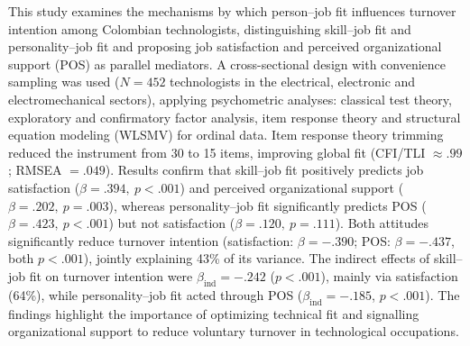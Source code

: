 \begin{secondaryabstract}
This study examines the mechanisms by which person--job fit influences turnover intention among Colombian technologists, distinguishing skill--job fit and personality--job fit and proposing job satisfaction and perceived organizational support (POS) as parallel mediators. A cross-sectional design with convenience sampling was used (\(N=452\) technologists in the electrical, electronic and electromechanical sectors), applying psychometric analyses: classical test theory, exploratory and confirmatory factor analysis, item response theory and structural equation modeling (WLSMV) for ordinal data. Item response theory trimming reduced the instrument from 30 to 15 items, improving global fit (CFI/TLI \(\approx .99\); RMSEA \(= .049\)). Results confirm that skill--job fit positively predicts job satisfaction (\(\beta=.394,\ p<.001\)) and perceived organizational support (\(\beta=.202,\ p=.003\)), whereas personality--job fit significantly predicts POS (\(\beta=.423,\ p<.001\)) but not satisfaction (\(\beta=.120,\ p=.111\)). Both attitudes significantly reduce turnover intention (satisfaction: \(\beta=-.390\); POS: \(\beta=-.437\), both \(p<.001\)), jointly explaining 43\% of its variance. The indirect effects of skill--job fit on turnover intention were \(\beta_{\text{ind}}=-.242\) (\(p<.001\)), mainly via satisfaction (64\%), while personality--job fit acted through POS (\(\beta_{\text{ind}}=-.185\), \(p<.001\)). The findings highlight the importance of optimizing technical fit and signalling organizational support to reduce voluntary turnover in technological occupations.
\end{secondaryabstract}